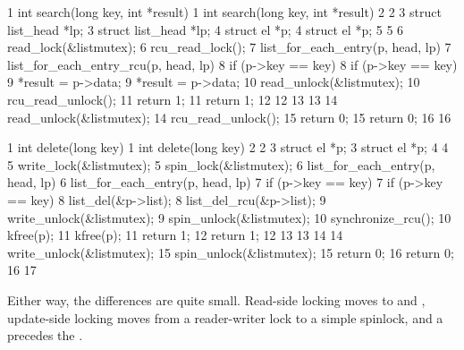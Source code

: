 \begin{VerbatimU}[fontsize=\tiny]
  1 int search(long key, int *result)    1 int search(long key, int *result)
  2 {                                    2 {
  3   struct list_head *lp;              3   struct list_head *lp;
  4   struct el *p;                      4   struct el *p;
  5                                      5
  6   read_lock(&listmutex);             6   rcu_read_lock();
  7   list_for_each_entry(p, head, lp) { 7   list_for_each_entry_rcu(p, head, lp) {
  8     if (p->key == key) {             8     if (p->key == key) {
  9       *result = p->data;             9       *result = p->data;
 10       read_unlock(&listmutex);      10       rcu_read_unlock();
 11       return 1;                     11       return 1;
 12     }                               12     }
 13   }                                 13   }
 14   read_unlock(&listmutex);          14   rcu_read_unlock();
 15   return 0;                         15   return 0;
 16 }                                   16 }
\end{VerbatimU}

\begin{VerbatimU}[fontsize=\tiny]
  1 int delete(long key)                 1 int delete(long key)
  2 {                                    2 {
  3   struct el *p;                      3   struct el *p;
  4                                      4
  5   write_lock(&listmutex);            5   spin_lock(&listmutex);
  6   list_for_each_entry(p, head, lp) { 6   list_for_each_entry(p, head, lp) {
  7     if (p->key == key) {             7     if (p->key == key) {
  8       list_del(&p->list);            8       list_del_rcu(&p->list);
  9       write_unlock(&listmutex);      9       spin_unlock(&listmutex);
                                        10       synchronize_rcu();
 10       kfree(p);                     11       kfree(p);
 11       return 1;                     12       return 1;
 12     }                               13     }
 13   }                                 14   }
 14   write_unlock(&listmutex);         15   spin_unlock(&listmutex);
 15   return 0;                         16   return 0;
 16 }                                   17 }
\end{VerbatimU}

Either way, the differences are quite small.
Read-side locking moves
to  and , update-side locking moves from
a reader-writer lock to a simple spinlock, and a 
precedes the .

